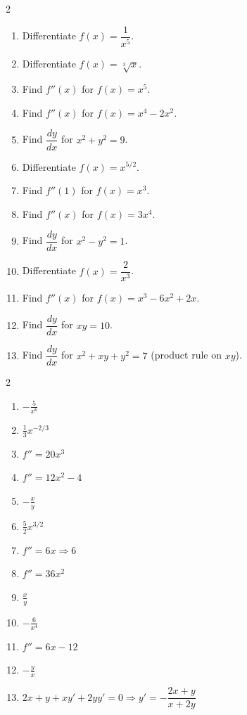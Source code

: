 \documentclass[11pt]{article}
\begin{document}
\begin{recapbox}
\begin{multicols}{2}
\small
\begin{enumerate}[leftmargin=*,itemsep=3pt]
  \item Differentiate $f(x)=\dfrac1{x^5}$.
  \item Differentiate $f(x)=\sqrt[3]{x}$.
  \item Find $f''(x)$ for $f(x)=x^5$.
  \item Find $f''(x)$ for $f(x)=x^4-2x^2$.
  \item Find $\dfrac{dy}{dx}$ for $x^2+y^2=9$.
  \item Differentiate $f(x)=x^{5/2}$.
  \item Find $f''(1)$ for $f(x)=x^3$.
  \item Find $f''(x)$ for $f(x)=3x^4$.
  \item Find $\dfrac{dy}{dx}$ for $x^2-y^2=1$.
  \item Differentiate $f(x)=\dfrac2{x^3}$.
  \item Find $f''(x)$ for $f(x)=x^3-6x^2+2x$.
  \item Find $\dfrac{dy}{dx}$ for $xy=10$.
  \item Find $\dfrac{dy}{dx}$ for $x^2+xy+y^2=7$ (product rule on $xy$).
\end{enumerate}
\end{multicols}
\end{recapbox}

\begin{keybox}
\begin{multicols}{2}
\small
\begin{enumerate}[leftmargin=*,itemsep=3pt]
  \item $-\tfrac5{x^6}$
  \item $\tfrac13x^{-2/3}$
  \item $f''=20x^3$
  \item $f''=12x^2-4$
  \item $-\tfrac xy$
  \item $\tfrac52x^{3/2}$
  \item $f''=6x\Rightarrow6$
  \item $f''=36x^2$
  \item $\tfrac xy$
  \item $-\tfrac6{x^4}$
  \item $f''=6x-12$
  \item $-\tfrac yx$
  \item $2x+y+xy'+2yy'=0\Rightarrow y'=-\dfrac{2x+y}{x+2y}$
\end{enumerate}
\end{multicols}
\end{keybox}
\end{document}
